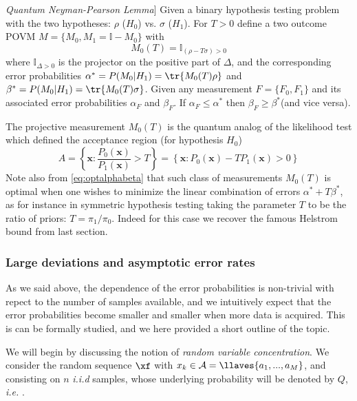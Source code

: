 {\textit{Quantum Neyman-Pearson Lemma}] \label{thm:Qlikelihoodrat}
Given a binary hypothesis testing problem with the two hypotheses:  $\rho$ ($H_{0}$) vs. $\sigma$ ($H_{1}$). For  $T>0$ define a two outcome POVM $M=\{M_{0},M_{1}=\mathbb{I} -M_{0}\}$ with
\begin{equation}\label{eq:optalphabeta}
M_{0}(T)=\mathbb{I} _{(\rho-T \sigma)>0}
\end{equation}
where $\mathbb{I} _{\Delta>0}$ is the projector on the positive part of $\Delta$,
and the corresponding error probabilities $\alpha^{*}=P(M_{0}|H_{1})=\tr{M_{0}(T)\rho}$ and $\beta^{*}=P(M_{0}|H_{1})=\tr{M_{0}(T)\sigma}$. Given any measurement $F=\{F_{0},F_{1}\}$ and its associated error probabilities $\alpha_{F}$ and $\beta_{F}$. If $\alpha_{F}\leq\alpha^{*}$ then $\beta_{F}\geq \beta^{*}$(and vice versa).


The projective measurement $M_{0}(T)$ is the quantum analog of the likelihood test which defined the acceptance region (for hypothesis $H_{0}$)
$$A=\left\{ \mathbf{x}: \frac{P_{0}(\mathbf{x})}{P_{1}(\mathbf{x})}> T\right\}=
\left\{ \mathbf{x}: P_{0}(\mathbf{x})-T P_{1}(\mathbf{x})> 0 \right\}$$
Note also from \eqref{eq:optalphabeta} that such class of measurements $M_{0}(T)$ is optimal when one wishes to minimize the linear combination of errors  $\alpha^{*}+T  \beta^{*}$, as for instance in { symmetric hypothesis testing} taking the parameter $T$ to be the ratio of priors: $T=\pi_{1}/\pi_{0}$. Indeed for this case we recover the famous Helstrom bound from last section.
}

\subsubsection{Large deviations and asymptotic error rates}
As we said above, the dependence of the error probabilities is non-trivial with repect to the number of samples available, and we intuitively expect that the error probabilities become smaller and smaller when more data is acquired. This is can be formally studied, and we here provided a short outline of the topic.

We will begin by discussing the notion of \textit{random variable concentration}. We consider the random sequence $\xf$ with $x_k \in \mathcal{A} = \llaves{a_1,...,a_M}$, and consisting on $n$ \textit{i.i.d} samples, whose underlying probability will be denoted by $Q$, \textit{i.e.} .

